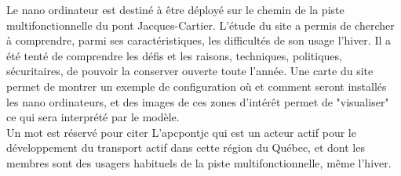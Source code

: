﻿\noindent Le nano ordinateur est destiné à être déployé sur le chemin de la piste multifonctionnelle du pont Jacques-Cartier. L'étude du site a permis de chercher à comprendre, parmi ses caractéristiques, les difficultés de son usage l'hiver. Il a été tenté de comprendre les défis et les raisons, techniques, politiques, sécuritaires, de pouvoir la conserver ouverte toute l'année. Une carte du site permet de montrer un exemple de configuration où et comment seront installés les nano ordinateurs, et des images de ces  zones d'intérêt permet de "visualiser" ce qui sera interprété par le modèle. 
\vspace{\baselineskip}
\\
\noindent Un mot est réservé pour citer L'\acrlong{apcpontjc} qui est un acteur actif pour le développement du transport actif dans cette région du Québec, et dont les membres sont des usagers habituels de la piste multifonctionnelle, même l'hiver.
